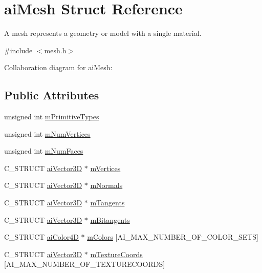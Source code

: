 \hypertarget{structai_mesh}{\section{ai\-Mesh Struct Reference}
\label{structai_mesh}
}


A mesh represents a geometry or model with a single material.  




{\ttfamily \#include $<$mesh.\-h$>$}



Collaboration diagram for ai\-Mesh\-:
\subsection*{Public Attributes}
\begin{DoxyCompactItemize}
\item 
unsigned int \hyperlink{structai_mesh_a99d66ac0a444068c1b252b30265cbf53}{m\-Primitive\-Types}
\item 
unsigned int \hyperlink{structai_mesh_ab34b7b5941e6636f1c08f615cbb072ef}{m\-Num\-Vertices}
\item 
unsigned int \hyperlink{structai_mesh_aeed22ee6963b79548f3877b3c905518e}{m\-Num\-Faces}
\item 
C\-\_\-\-S\-T\-R\-U\-C\-T \hyperlink{structai_vector3_d}{ai\-Vector3\-D} $\ast$ \hyperlink{structai_mesh_afd4588abb3e1c72821ae0234a3850662}{m\-Vertices}
\item 
C\-\_\-\-S\-T\-R\-U\-C\-T \hyperlink{structai_vector3_d}{ai\-Vector3\-D} $\ast$ \hyperlink{structai_mesh_aec81b496b4d93838cef038933dabe9b9}{m\-Normals}
\item 
C\-\_\-\-S\-T\-R\-U\-C\-T \hyperlink{structai_vector3_d}{ai\-Vector3\-D} $\ast$ \hyperlink{structai_mesh_af367ff78bd69f3e83d7edc8ad67dc5df}{m\-Tangents}
\item 
C\-\_\-\-S\-T\-R\-U\-C\-T \hyperlink{structai_vector3_d}{ai\-Vector3\-D} $\ast$ \hyperlink{structai_mesh_ab2a81bfe1731f01271ebab274a8f01c4}{m\-Bitangents}
\item 
C\-\_\-\-S\-T\-R\-U\-C\-T \hyperlink{structai_color4_d}{ai\-Color4\-D} $\ast$ \hyperlink{structai_mesh_ad9215f67bd0c2277b10775a8adb66b96}{m\-Colors} \mbox{[}A\-I\-\_\-\-M\-A\-X\-\_\-\-N\-U\-M\-B\-E\-R\-\_\-\-O\-F\-\_\-\-C\-O\-L\-O\-R\-\_\-\-S\-E\-T\-S\mbox{]}
\item 
C\-\_\-\-S\-T\-R\-U\-C\-T \hyperlink{structai_vector3_d}{ai\-Vector3\-D} $\ast$ \hyperlink{structai_mesh_a4a50b11d00ef50f419c75cab0f6bddd6}{m\-Texture\-Coords} \mbox{[}A\-I\-\_\-\-M\-A\-X\-\_\-\-N\-U\-M\-B\-E\-R\-\_\-\-O\-F\-\_\-\-T\-E\-X\-T\-U\-R\-E\-C\-O\-O\-R\-D\-S\mbox{]}

\end{DoxyCompactItemize}
